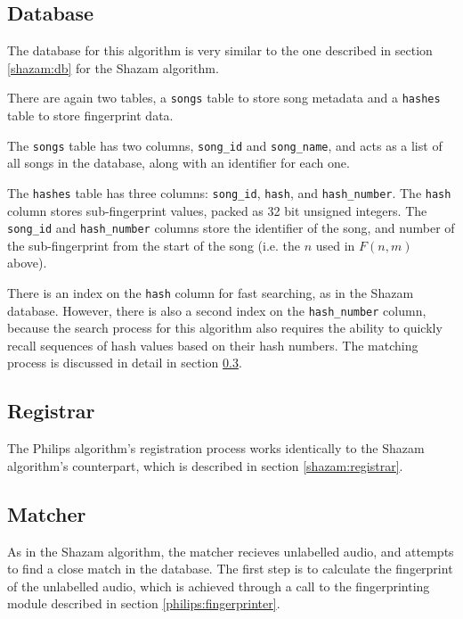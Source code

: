 \documentclass[12pt,a4paper,twoside,openright]{report}
\begin{document}
\subsection{Database}

The database for this algorithm is very similar to the one described in section \ref{shazam:db} for the Shazam algorithm.

There are again two tables, a \lstinline{songs} table to store song metadata and a \lstinline{hashes} table to store fingerprint data.

The \lstinline{songs} table has two columns, \lstinline{song_id} and \lstinline{song_name}, and acts as a list of all songs in the database, along with an identifier for each one.

The \lstinline{hashes} table has three columns: \lstinline{song_id}, \lstinline{hash}, and \lstinline{hash_number}. The \lstinline{hash} column stores sub-fingerprint values, packed as 32 bit unsigned integers. The \lstinline{song_id} and \lstinline{hash_number} columns store the identifier of the song, and number of the sub-fingerprint from the start of the song (i.e. the $n$ used in $F(n,m)$ above).

There is an index on the \lstinline{hash} column for fast searching, as in the Shazam database. However, there is also a second index on the \lstinline{hash_number} column, because the search process for this algorithm also requires the ability to quickly recall sequences of hash values based on their hash numbers. The matching process is discussed in detail in section \ref{philips:matcher}.


\subsection{Registrar}

The Philips algorithm's registration process works identically to the Shazam algorithm's counterpart, which is described in section \ref{shazam:registrar}.


\subsection{Matcher}
\label{philips:matcher}

As in the Shazam algorithm, the matcher recieves unlabelled audio, and attempts to find a close match in the database. The first step is to calculate the fingerprint of the unlabelled audio, which is achieved through a call to the fingerprinting module described in section \ref{philips:fingerprinter}.
\end{document}
